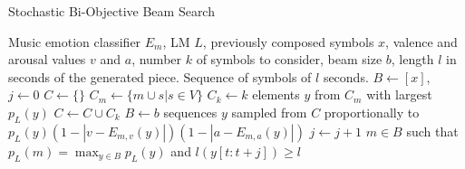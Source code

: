 \begin{algorithm}[!h]
\caption{Stochastic Bi-Objective Beam Search}
\label{alg:sbs}
\begin{algorithmic}[1]
\REQUIRE Music emotion classifier $E_m$, LM $L$, previously composed symbols $x$, valence and arousal values $v$ and $a$, number $k$ of symbols to consider, beam size $b$, length $l$ in seconds of the generated piece.
\ENSURE Sequence of symbols of $l$ seconds.
\STATE $B \gets [x]$, $j \gets 0$ \label{line:sbs:init}
 \label{line:sbs:stopping_condition}
    \STATE $C \gets \{\}$ \label{line:sbs:init_while}
        \STATE $C_m \gets \{m \cup s \vert s \in V\}$ \label{line:sbs:children}
        \STATE $C_k \gets k$ elements $y$ from $C_m$ with largest $p_L(y)$ \label{line:sbs:pruning_model}
        \STATE $C \gets C \cup C_k$ \label{line:sbs:total_children}
    \ENDFOR
    \STATE $B \gets b$ sequences $y$ sampled from $C$ proportionally to $p_L(y) (1 - |v - E_{m,v}(y)|) (1 - |a - E_{m,a}(y)|)$ \label{line:sbs:sample_next_beam}
    \STATE $j \gets j + 1$ \label{line:sbs:end_while}
\ENDWHILE
\RETURN $m \in B$ such that $p_L(m) = \max_{y \in B}p_L(y)$ and $l(y[t: t+j]) \geq l$ \label{line:sbs:return}
\end{algorithmic}
\end{algorithm}

